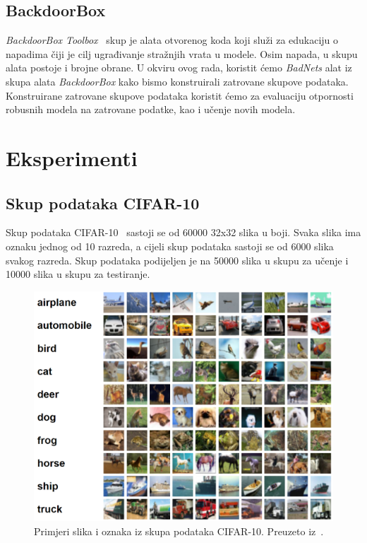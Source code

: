 \documentclass[times, utf8, zavrsni, numeric]{fer}
\begin{document}
\section{BackdoorBox}

\textit{BackdoorBox Toolbox}~\cite{li2023backdoorbox} skup je alata otvorenog koda koji služi za edukaciju o napadima čiji je cilj ugrađivanje stražnjih vrata u modele.
Osim napada, u skupu alata postoje i brojne obrane. U okviru ovog rada, koristit ćemo \textit{BadNets} alat iz skupa alata \textit{BackdoorBox} kako bismo konstruirali zatrovane skupove podataka.
Konstruirane zatrovane skupove podataka koristit ćemo za evaluaciju otpornosti robusnih modela na zatrovane podatke, kao i učenje novih modela.

\chapter{Eksperimenti}

\section{Skup podataka CIFAR-10}

Skup podataka CIFAR-10~\cite{krizhevsky2009learning} sastoji se od 60000 32x32 slika u boji. Svaka slika ima oznaku jednog od 10 razreda,
a cijeli skup podataka sastoji se od 6000 slika svakog razreda. Skup podataka podijeljen je na 50000 slika u skupu za učenje i 10000 slika u skupu za testiranje.

\begin{figure}[htb]
    \centering
    \includegraphics[scale=0.5]{cifar.png}
    \caption{Primjeri slika i oznaka iz skupa podataka CIFAR-10. Preuzeto iz~\cite{krizhevsky2009learning}.}
    \label{fig:cifar10}
\end{figure}
\end{document}
